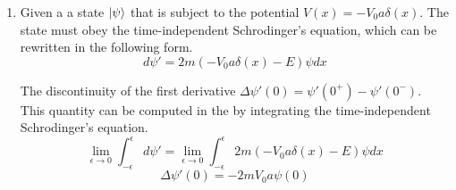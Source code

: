 \begin{sol}
\begin{enumerate}[label=\textbf{(\alph*)}]

	
	\item
	Given a a state $\ket\psi$ that is subject to the potential $V(x)=-V_0a\delta(x)$. The state must obey the time-independent Schrodinger's equation, which can be rewritten in the following form.
    \begin{equation}
        d\psi'=2m(-V_0a\delta(x)-E)\psi dx  
    \end{equation}
    
    The discontinuity of the first derivative $\Delta\psi'(0)=\psi'(0^+)-\psi'(0^-)$. This quantity can be computed in the by integrating the time-independent Schrodinger's equation.
    \begin{equation}
        \lim_{\epsilon \to 0}\int_{-\epsilon}^{\epsilon}d\psi'=
        \lim_{\epsilon \to 0}\int_{-\epsilon}^{\epsilon}2m(-V_0a\delta(x)-E)\psi dx
    \end{equation}
    \begin{equation}
        \Delta\psi'(0)=-2mV_0a\psi(0)
    \end{equation}
    

\end{enumerate}
\end{sol}
